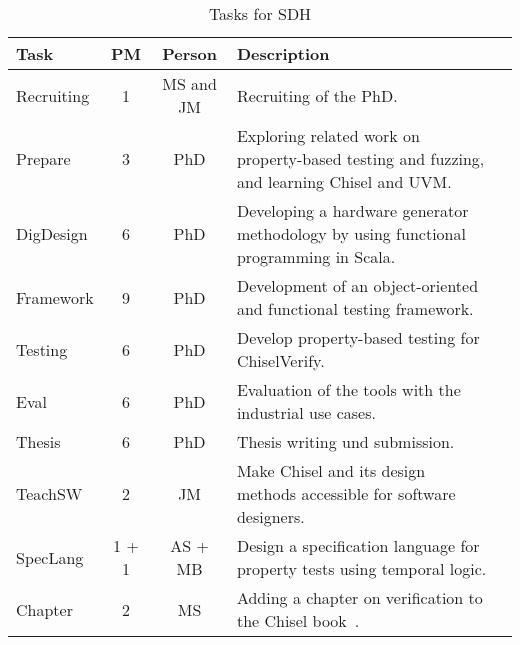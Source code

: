 \documentclass[fleqn,12pt]{article}
\begin{document}
\begin{table*}%
{\small
  \begin{center}
    \begin{tabular}{lccp{110mm}l}
      \toprule
      Task                   & PM  & Person    & Description                                                                                   \\
      \midrule
      Recruiting             & 1   & MS and JM & Recruiting of the PhD.                                                                    \\
      \midrule
      Prepare                & 3   & PhD      & Exploring related work on property-based testing and fuzzing, and learning Chisel and UVM.                           \\
      DigDesign               & 6   & PhD      & Developing a hardware generator methodology by using functional programming in Scala.         \\
      Framework              & 9   & PhD      & Development of an object-oriented and functional testing framework.                      \\
      Testing & 6   & PhD      & Develop property-based testing for ChiselVerify.                                                      \\
      Eval                   & 6 & PhD    & Evaluation of the tools with the industrial use cases.                                                     \\
      Thesis                 & 6   & PhD    & Thesis writing und submission.                                                                \\
      \midrule
      TeachSW                 &  2  & JM            & Make Chisel and its design methods accessible for software designers. \\
      {\color{red}SpecLang}                &    1 + 1   &  AS + MB & Design a specification language for property tests using temporal logic. \\
      Chapter                & 2   & MS        & Adding a chapter on verification to the Chisel book~\cite{chisel:book}.                       \\
      \bottomrule
    \end{tabular}
  \end{center}
  \caption{Tasks for SDH}\label{tab:packages}
}
\end{table*}
\end{document}
